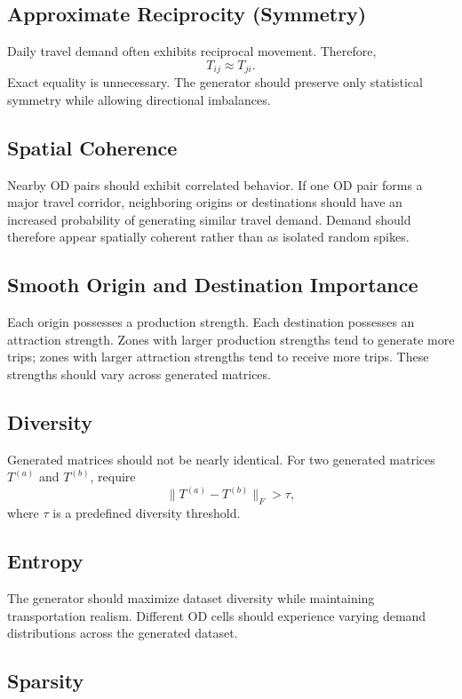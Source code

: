 \documentclass[11pt,a4paper]{article}
\begin{document}
\subsection{Approximate Reciprocity (Symmetry)}

Daily travel demand often exhibits reciprocal movement. Therefore,
\[
T_{ij}\approx T_{ji}.
\]
Exact equality is unnecessary. The generator should preserve only statistical symmetry while allowing directional imbalances.

\subsection{Spatial Coherence}

Nearby OD pairs should exhibit correlated behavior. If one OD pair forms a major travel corridor, neighboring origins or destinations should have an increased probability of generating similar travel demand. Demand should therefore appear spatially coherent rather than as isolated random spikes.

\subsection{Smooth Origin and Destination Importance}

Each origin possesses a production strength. Each destination possesses an attraction strength. Zones with larger production strengths tend to generate more trips; zones with larger attraction strengths tend to receive more trips. These strengths should vary across generated matrices.

\subsection{Diversity}

Generated matrices should not be nearly identical. For two generated matrices $T^{(a)}$ and $T^{(b)}$, require
\[
\|T^{(a)}-T^{(b)}\|_F>\tau,
\]
where $\tau$ is a predefined diversity threshold.

\subsection{Entropy}

The generator should maximize dataset diversity while maintaining transportation realism. Different OD cells should experience varying demand distributions across the generated dataset.

\subsection{Sparsity}
\end{document}

